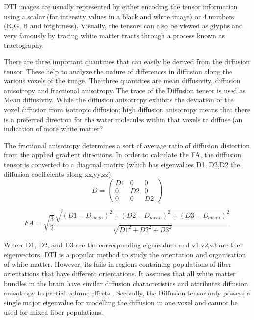 \documentclass[msthesis.tex]{subfiles}
\begin{document}
DTI images are usually represented by either encoding the tensor information using a scalar (for intensity values in a black and white image) or 4 numbers (R,G, B and brightness). Visually, the tensors can also be viewed as glyphs and very famously by tracing white matter tracts through a process known as tractography.


There are three important quantities that can easily be derived from the diffusion tensor. These help to analyze the nature of differences in diffusion along the various voxels of the image. The three quantities are mean diffusivity, diffusion anisotropy and fractional anisotropy. The trace of the Diffusion tensor is used as Mean diffusivity. While the diffusion anisotropy exhibits the deviation of the voxel diffusion from isotropic diffusion; high diffusion anisotropy means that there is a preferred direction for the water molecules within that voxels to diffuse (an indication of more white matter?

The fractional anisotropy determines a sort of average ratio of diffusion distortion from the applied gradient directions. In order to calculate the FA, the diffusion tensor is converted to a diagonal matrix (which has eigenvalues D1, D2,D2 the diffusion coefficients along xx,yy,zz) \\
\begin{equation*}
D =
 \begin{pmatrix}
D1 & 0 & 0 \\
0 & D2 & 0 \\
0 & 0 & D2
\end{pmatrix}   
\end{equation*}


\begin{equation}
FA = \sqrt{\frac{3}{2}} \frac{\sqrt{(D1 -D_{mean})^2+(D2 -D_{mean})^2 + (D3 -D_{mean})^2
}}{\sqrt{D1^2 + D2^2 + D3^2}}
\end{equation}


Where D1, D2, and D3 are the corresponding eigenvalues and v1,v2,v3 are the eigenvectors.
DTI is a popular method to study the orientation and organisation of white matter. However, its fails in regions containing populations of fiber orientations that have different orientations. It assumes that all white matter bundles in the brain have similar diffusion characteristics and attributes diffusion anisotropy to partial volume effects \cite{tournier2004direct}. Secondly, the Diffusion tensor only possess a single major eigenvalue for modelling the diffusion in one voxel and cannot be used for mixed fiber populations.
\end{document}
